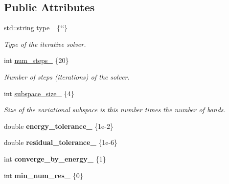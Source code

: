 \subsection*{Public Attributes}
\begin{DoxyCompactItemize}
\item 
std\+::string \hyperlink{structsirius_1_1_iterative__solver__input__section_afe633b0a2befbdceae1abd1354bf14cc}{type\+\_\+} \{\char`\"{}\char`\"{}\}
\begin{DoxyCompactList}\small\item\em Type of the iterative solver. \end{DoxyCompactList}\item 
int \hyperlink{structsirius_1_1_iterative__solver__input__section_a5c1bb6191eb63e0de00c89978fce53a1}{num\+\_\+steps\+\_\+} \{20\}
\begin{DoxyCompactList}\small\item\em Number of steps (iterations) of the solver. \end{DoxyCompactList}\item 
int \hyperlink{structsirius_1_1_iterative__solver__input__section_ab0d3c4fac532bbf39de7d1df8158895e}{subspace\+\_\+size\+\_\+} \{4\}
\begin{DoxyCompactList}\small\item\em Size of the variational subspace is this number times the number of bands. \end{DoxyCompactList}\item 
\hypertarget{structsirius_1_1_iterative__solver__input__section_ab7446f0c683203e3bd78119c21b72aa7}{}double {\bfseries energy\+\_\+tolerance\+\_\+} \{1e-\/2\}\label{structsirius_1_1_iterative__solver__input__section_ab7446f0c683203e3bd78119c21b72aa7}

\item 
\hypertarget{structsirius_1_1_iterative__solver__input__section_a23499db965012034af8186c03ed544bd}{}double {\bfseries residual\+\_\+tolerance\+\_\+} \{1e-\/6\}\label{structsirius_1_1_iterative__solver__input__section_a23499db965012034af8186c03ed544bd}

\item 
\hypertarget{structsirius_1_1_iterative__solver__input__section_a10eed74b458db3ac5f6360c3cceff78f}{}int {\bfseries converge\+\_\+by\+\_\+energy\+\_\+} \{1\}\label{structsirius_1_1_iterative__solver__input__section_a10eed74b458db3ac5f6360c3cceff78f}

\item 
\hypertarget{structsirius_1_1_iterative__solver__input__section_aec566aaaf2ceef308111fc00a5330346}{}int {\bfseries min\+\_\+num\+\_\+res\+\_\+} \{0\}\label{structsirius_1_1_iterative__solver__input__section_aec566aaaf2ceef308111fc00a5330346}


\end{DoxyCompactItemize}
